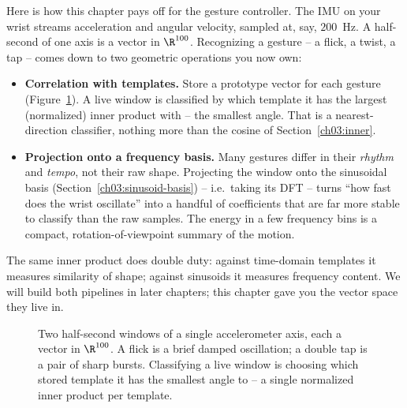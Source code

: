 \begin{goalbox}
Here is how this chapter pays off for the gesture controller. The IMU on your wrist streams
acceleration and angular velocity, sampled at, say, $200$~Hz. A half-second of one axis is a vector
in $\R^{100}$. Recognizing a gesture -- a flick, a twist, a tap -- comes down to two geometric
operations you now own:

\begin{itemize}
  \item \textbf{Correlation with templates.} Store a prototype vector for each gesture
    (Figure~\ref{ch03:fig-imu-traces}). A live window is classified by which template it has the
    largest (normalized) inner product with -- the smallest angle. That is a nearest-direction
    classifier, nothing more than the cosine of Section~\ref{ch03:inner}.
  \item \textbf{Projection onto a frequency basis.} Many gestures differ in their \emph{rhythm} and
    \emph{tempo}, not their raw shape. Projecting the window onto the sinusoidal basis
    (Section~\ref{ch03:sinusoid-basis}) -- i.e.\ taking its DFT -- turns ``how fast does the wrist
    oscillate'' into a handful of coefficients that are far more stable to classify than the raw
    samples. The energy in a few frequency bins is a compact, rotation-of-viewpoint summary of the
    motion.
\end{itemize}

The same inner product does double duty: against time-domain templates it measures similarity of
shape; against sinusoids it measures frequency content. We will build both pipelines in later
chapters; this chapter gave you the vector space they live in.
\end{goalbox}

\begin{figure}[H]
\centering
{}
\caption{Two half-second windows of a single accelerometer axis, each a vector in $\R^{100}$.
A flick is a brief damped oscillation; a double tap is a pair of sharp bursts. Classifying a live
window is choosing which stored template it has the smallest angle to -- a single normalized inner
product per template.}
\label{ch03:fig-imu-traces}
\end{figure}

